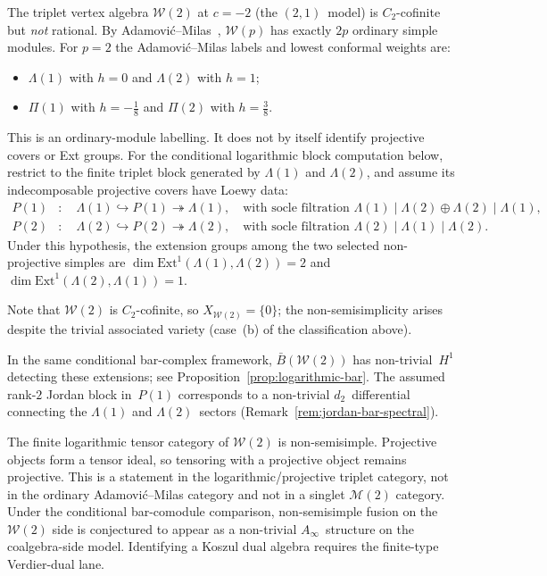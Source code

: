 \begin{example}[Triplet \texorpdfstring{$\mathcal{W}(2)$}{W(2)} at
\texorpdfstring{$c = c_{2,1} = -2$}{c = c(2,1) = -2}]
\label{ex:triplet-logarithmic}
The triplet vertex algebra $\mathcal{W}(2)$ at $c = -2$
(the $(2,1)$~model) is $C_2$-cofinite but \emph{not} rational.
By Adamovi\'c--Milas~\cite{AdamovicMilas2008},
$\mathcal{W}(p)$ has exactly $2p$ ordinary simple modules.
For $p = 2$ the Adamovi\'c--Milas labels and lowest conformal
weights are:
\begin{itemize}
\item $\Lambda(1)$ with $h = 0$ and $\Lambda(2)$ with $h = 1$;
\item $\Pi(1)$ with $h = -\tfrac{1}{8}$ and
$\Pi(2)$ with $h = \tfrac{3}{8}$.
\end{itemize}
This is an ordinary-module labelling. It does not by itself identify
projective covers or Ext groups. For the conditional logarithmic
block computation below, restrict to the finite triplet block
generated by $\Lambda(1)$ and $\Lambda(2)$, and assume its
indecomposable projective covers have Loewy data:
\begin{align}
P(1) &: \quad \Lambda(1) \hookrightarrow P(1) \twoheadrightarrow
\Lambda(1), \quad \text{with socle filtration }
\Lambda(1) \mid \Lambda(2) \oplus \Lambda(2) \mid
\Lambda(1), \\
P(2) &: \quad \Lambda(2) \hookrightarrow P(2) \twoheadrightarrow
\Lambda(2), \quad \text{with socle filtration }
\Lambda(2) \mid \Lambda(1) \mid \Lambda(2).
\end{align}
Under this hypothesis, the extension groups among the two selected
non-projective simples are
$\dim \mathrm{Ext}^1(\Lambda(1), \Lambda(2)) = 2$
and $\dim \mathrm{Ext}^1(\Lambda(2), \Lambda(1)) = 1$.

Note that $\mathcal{W}(2)$ is $C_2$-cofinite, so
$X_{\mathcal{W}(2)} = \{0\}$; the non-semisimplicity arises
despite the trivial associated variety (case~(b) of the
classification above).

In the same conditional bar-complex framework,
$\bar{B}(\mathcal{W}(2))$ has non-trivial~$H^1$
detecting these extensions;
see Proposition~\ref{prop:logarithmic-bar}.
The assumed rank-$2$ Jordan block in~$P(1)$ corresponds to
a non-trivial $d_2$~differential connecting
the $\Lambda(1)$ and $\Lambda(2)$~sectors
(Remark~\ref{rem:jordan-bar-spectral}).

The finite logarithmic tensor category of $\mathcal W(2)$ is
non-semisimple. Projective objects form a tensor ideal, so tensoring
with a projective object remains projective. This is a statement in
the logarithmic/projective triplet category, not in the ordinary
Adamovi\'c--Milas category and not in a singlet
$\mathcal M(2)$ category.
Under the conditional bar-comodule comparison, non-semisimple fusion
on the $\mathcal{W}(2)$ side is conjectured to appear as a non-trivial
$A_\infty$~structure on the coalgebra-side model. Identifying a
Koszul dual algebra requires the finite-type Verdier-dual lane.
\end{example}

